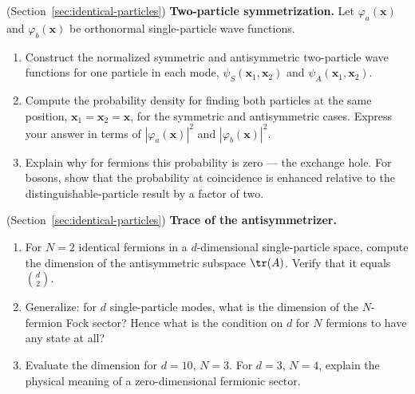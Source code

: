 \begin{problemset}

\item (Section~\ref{sec:identical-particles}) \textbf{Two-particle symmetrization.}
    Let $\varphi_a(\bm x)$ and $\varphi_b(\bm x)$ be orthonormal single-particle wave functions.
    \begin{enumerate}
        \item[(a)] Construct the normalized symmetric and antisymmetric two-particle wave functions
	        for one particle in each mode, $\psi_S(\bm x_1, \bm x_2)$ and $\psi_A(\bm x_1, \bm x_2)$.
        \item[(b)] Compute the probability density for finding both particles at the same position, $\bm x_1 = \bm x_2 = \bm x$, for the symmetric and antisymmetric cases. Express your answer in terms of $|\varphi_a(\bm x)|^2$ and $|\varphi_b(\bm x)|^2$.
        \item[(c)] Explain why for fermions this probability is zero --- the exchange hole. For bosons, show that the probability at coincidence is enhanced relative to the distinguishable-particle result by a factor of two.
    \end{enumerate}

\item (Section~\ref{sec:identical-particles}) \textbf{Trace of the antisymmetrizer.}
    \begin{enumerate}
        \item[(a)] For $N = 2$ identical fermions in a $d$-dimensional single-particle space, compute the dimension of the antisymmetric subspace $\tr(A)$. Verify that it equals $\binom{d}{2}$.
        \item[(b)] Generalize: for $d$ single-particle modes, what is the dimension of the $N$-fermion Fock sector? Hence what is the condition on $d$ for $N$ fermions to have any state at all?
        \item[(c)] Evaluate the dimension for $d = 10$, $N = 3$. For $d = 3$, $N = 4$, explain the physical meaning of a zero-dimensional fermionic sector.
    \end{enumerate}


\end{problemset}
